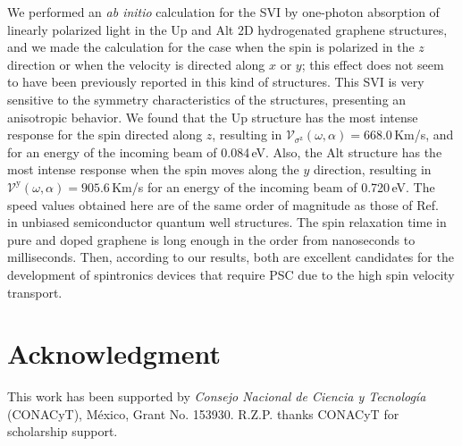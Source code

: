 \documentclass[floatfix,prb,aps,superscriptaddress,showpacs,11pt,preprint,letterpaper]{revtex4}
\begin{document}
We performed an \emph{ab initio} calculation for the SVI by one-photon
absorption of linearly polarized light in the Up and Alt 2D hydrogenated
graphene structures, and we made the calculation for the case when the spin is
polarized in the $z$ direction or when the velocity is directed along $x$ or
$y$; this effect does not seem to have been previously reported in this kind of
structures. This SVI is very sensitive to the symmetry characteristics of the
structures, presenting an anisotropic behavior. We found that the Up structure
has the most intense response for the spin directed along $z$, resulting in
$\mathcal{V}_{\sigma^{\mathrm{z}}} (\omega,\alpha) = 668.0$\,Km/s, and for an
energy of the incoming beam of 0.084\,eV. Also, the Alt structure has the most
intense response when the spin moves along the $y$ direction, resulting in
$\mathcal{V}^{\mathrm{y}} (\omega,\alpha) = 905.6$\,Km/s for an energy of the
incoming beam of 0.720\,eV. The speed values obtained here are of the same order
of magnitude as those of Ref.~ in unbiased
semiconductor quantum well structures. The spin relaxation time in pure and
doped graphene is long enough in the order from nanoseconds to milliseconds.
\cite{wojtaszekPRB13,ertlerPRB09} Then, according to our results, both are
excellent candidates for the development of spintronics devices that require PSC
due to the high spin velocity transport.

\section{Acknowledgment} %

This work has been supported by \emph{Consejo Nacional de Ciencia y
Tecnolog\'ia} (CONACyT), M\'exico, Grant No. 153930. R.Z.P. thanks CONACyT for
scholarship support.

\end{document}
